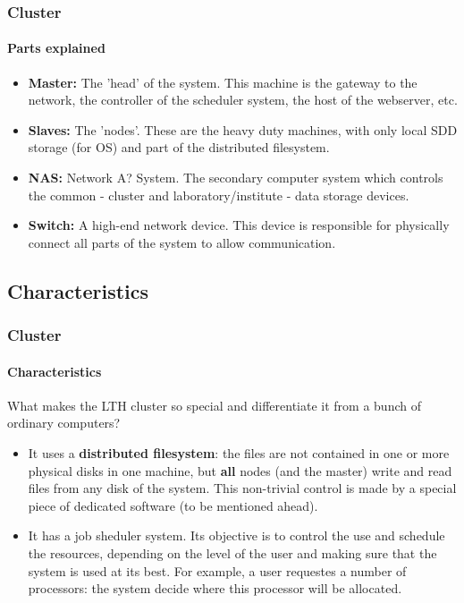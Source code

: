 \documentclass[svgnames,smaller,table]{beamer}
\begin{document}
\begin{frame}
  \frametitle{Cluster}
  \framesubtitle{Parts explained}
  \begin{itemize}
  \item \textbf{Master:} The 'head' of the system. This machine is the gateway to the network, the controller of the scheduler system, the host of the webserver, etc.
  \item \textbf{Slaves:} The 'nodes'. These are the heavy duty machines, with only local SDD storage (for OS) and part of the distributed filesystem.
  \item \textbf{NAS:} Network A? System. The secondary computer system which controls the common - cluster and laboratory/institute - data storage devices.
  \item \textbf{Switch:} A high-end network device. This device is responsible for physically connect all parts of the system to allow communication.
  \end{itemize}
  
\end{frame}


\subsection{Characteristics}
\begin{frame}
  \frametitle{Cluster}
  \framesubtitle{Characteristics}
  What makes the LTH cluster so special and differentiate it from a bunch of ordinary computers?\\
  \vspace{10px}
  \begin{itemize}
  \item It uses a \textbf{distributed filesystem}: the files are not contained in one or more physical disks in one machine, but \textbf{all} nodes (and the master) write and read files from any disk of the system. This non-trivial control is made by a special piece of dedicated software (to be mentioned ahead). 
  \item It has a job sheduler system. Its objective is to control the use and schedule the resources, depending on the level of the user and making sure that the system is used at its best. For example, a user requestes a number of processors: the system decide where this processor will be allocated.
  \end{itemize}
\end{frame}
\end{document}
